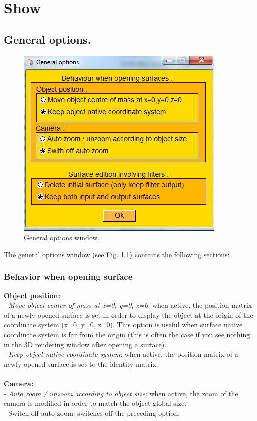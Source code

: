 
\chapter{Show}
\minitoc 


\section{General options.} 
\begin{figure}
  \centering
  \includegraphics[scale=0.5]{images/Show/General_options_window.png} 
	\caption{General options window.}
\label{general_options_window}
 
\end{figure}


The general options window (see Fig. \ref{general_options_window}) contains the following sections:
\subsection{Behavior when opening surface}
\textbf{\underline{Object position:}}\\
- \textit{Move object center of mass at x=0, y=0, z=0}: when active,
the position matrix of a newly opened surface is set in
order to display the object at the origin of the coordinate
system (x=0, y=0, z=0). This option is useful when surface
native coordinate system is far from the origin (this is often
the case if you see nothing in the 3D rendering window
after opening a surface).\\
- \textit{Keep object native coordinate system}: when active, the
position matrix of a newly opened surface is set to the identity matrix.\\\\
\noindent
\textbf{\underline{Camera:}}\\
- \textit{Auto zoom / unzoom according to object size}: when active, the zoom of the camera is modified in
order to match the object global size.\\
- Switch off auto zoom: switches off the preceding option.
 
